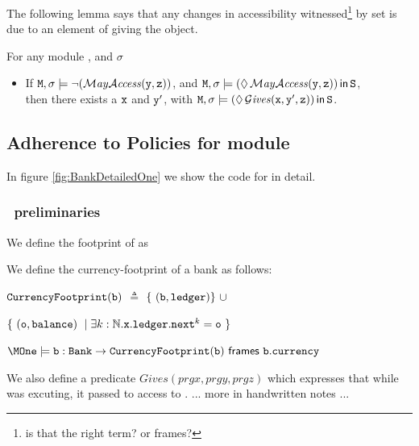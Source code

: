 The following lemma says that any changes in accessibility witnessed\footnote{is that the right term? or frames?}
by set  is due to an element of  giving the object.

\begin{lemma}
For any module \M, and  $\sigma$

\begin{itemize}
\item
If  ${\mbox{\tt{M}}}, \sigma  \models \neg(\mathcal{M}\textrm{\textit{ay}}{\mathcal{A}}\textrm{\textit{ccess}}({\mbox{\tt{y}}},{\mbox{\tt{z}}}))$, and
${\mbox{\tt{M}}}, \sigma \models (\lozenge\, \mathcal{M}\textrm{\textit{ay}}{\mathcal{A}}\textrm{\textit{ccess}}({\mbox{\tt{y}}},{\mbox{\tt{z}}}))\,{\bf{\sf {in}}}\, {\mbox{\tt{S}}}$, \\
 then there exists a  ${\mbox{\tt{x}}}$  and  ${\mbox{\tt{y}}}'$, with
${\mbox{\tt{M}}},\sigma \models (\lozenge\, \mathcal{G}\textrm{\textit{ives}}({\mbox{\tt{x}}},{\mbox{\tt{y}}}',{\mbox{\tt{z}}}))\,{\bf{\sf {in}}}\, {\mbox{\tt{S}}}$.
\end{itemize}

\end{lemma}

\subsection{Adherence to Policies for module \MOne}
\label{section:Adherence:ModuleOne}

In figure \ref{fig:BankDetailedOne} we show the  code for \MOne in detail.

\subsubsection{\MOne~preliminaries}
We define the footprint of  as

\begin{definition}We define the currency-footprint of a bank as follows:

${\mbox{\tt{CurrencyFootprint}}}({\mbox{\tt{b}}})$ $\triangleq$
$\{ \ (\prg{b},\prg{ledger}) \} \ \cup$\\
\strut \hspace{4.8cm}
$\{ \ ({\mbox{\tt{o}}},{\mbox{\tt{balance}}})\ \mid \exists k:\mathbb{N}. {\mbox{\tt{x}}}.{\mbox{\tt{ledger}}}.{\mbox{\tt{next}}}^k={\mbox{\tt{o}}} \ \}$
\end{definition}

\begin{lemma}
$\MOne \models \prg{b}:\prg{Bank} \rightarrow \prg{CurrencyFootprint}(\prg{b}) \frames \prg{b}.\prg{currency}$
\end{lemma}

We also define a predicate $Gives(prg{x},prg{y},prg{z})$ which expresses that while  was excuting, it
passed to  access to .
... more in handwritten notes ...

